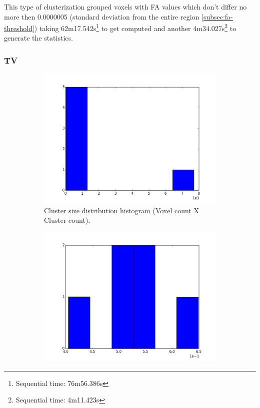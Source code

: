 \documentclass[a4paper,11pt]{report}
\begin{document}
    This type of clusterization grouped voxels with FA values which don't differ no more then 0.0000005 (standard deviation from the entire region \ref{subsec:fa-threshold}) taking 62m17.542s\footnote{Sequential time: 76m56.386s} to get computed and another 4m34.027s\footnote{Sequential time: 4m11.423s} to generate the statistics.

    \newpage
    \subsubsection{TV}
    \begin{figure}[!ht]
      \centering

      \begin{subfigure}[t]{.49\textwidth}
        \includegraphics[width=1\linewidth]{img/histograms/tv_clustered_fa_mask_region_sizes_hist.png}
        \caption{Cluster size distribution histogram (Voxel count X Cluster count).}
        \label{subfig:fa_hist_region}
      \end{subfigure}\hfill%
      \begin{subfigure}[t]{.49\textwidth}
        \includegraphics[width=1\linewidth]{img/histograms/tv_clustered_fa_mask_fa_means_hist.png}

\end{subfigure}
\end{figure}
\end{document}
